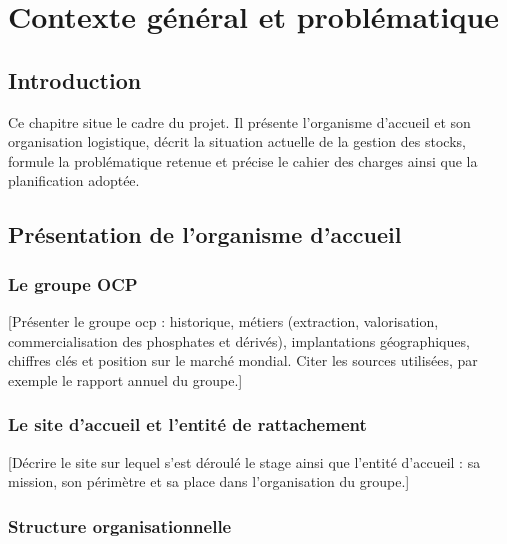 \chapter{Contexte général et problématique}
\label{chap:contexte}

\section*{Introduction}

Ce chapitre situe le cadre du projet. Il présente l'organisme d'accueil et son
organisation logistique, décrit la situation actuelle de la gestion des stocks,
formule la problématique retenue et précise le cahier des charges ainsi que la
planification adoptée.

\section{Présentation de l'organisme d'accueil}
\label{sec:organisme}

\subsection{Le groupe OCP}

\hspace{1cm}[Présenter le groupe \gls{ocp} : historique, métiers (extraction,
valorisation, commercialisation des phosphates et dérivés), implantations
géographiques, chiffres clés et position sur le marché mondial. Citer les
sources utilisées, par exemple le rapport annuel du groupe.]

\subsection{Le site d'accueil et l'entité de rattachement}

\hspace{1cm}[Décrire le site sur lequel s'est déroulé le stage ainsi que
l'entité d'accueil : sa mission, son périmètre et sa place dans l'organisation
du groupe.]

\subsection{Structure organisationnelle}

